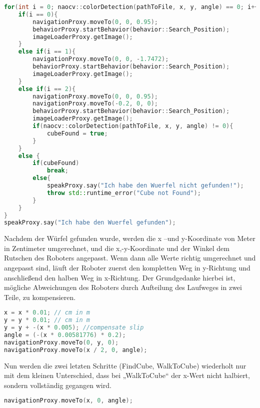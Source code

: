 \begin{lstlisting}[language=c++,
                   caption={Mainloop, Teil 2},
                   label={lst:main2}]
for(int i = 0; naocv::colorDetection(pathToFile, x, y, angle) == 0; i++){
    if(i == 0){
        navigationProxy.moveTo(0, 0, 0.95);
        behaviorProxy.startBehavior(behavior::Search_Position);
        imageLoaderProxy.getImage();
    }
    else if(i == 1){
        navigationProxy.moveTo(0, 0, -1.7472);
        behaviorProxy.startBehavior(behavior::Search_Position);
        imageLoaderProxy.getImage();
    }
    else if(i == 2){
        navigationProxy.moveTo(0, 0, 0.95);
        navigationProxy.moveTo(-0.2, 0, 0);
        behaviorProxy.startBehavior(behavior::Search_Position);
        imageLoaderProxy.getImage();
        if(naocv::colorDetection(pathToFile, x, y, angle) != 0){
            cubeFound = true;
        }
    }
    else {
        if(cubeFound)
            break;
        else{
            speakProxy.say("Ich habe den Wuerfel nicht gefunden!");
            throw std::runtime_error("Cube not Found");
        }
    }
}
speakProxy.say("Ich habe den Wuerfel gefunden");
\end{lstlisting}

        Nachdem der Würfel gefunden wurde, werden die x –und y-Koordinate von
        Meter in Zentimeter umgerechnet, und die x,-y-Koordinate und der Winkel
        dem Rutschen des Roboters angepasst.
        Wenn dann alle Werte richtig umgerechnet und angepasst sind, läuft der
        Roboter zuerst den kompletten Weg in y-Richtung und anschließend den
        halben Weg in x-Richtung.
        Der Grundgedanke hierbei ist, mögliche Abweichungen des Roboters durch
        Aufteilung des Laufweges in zwei Teile, zu kompensieren.

\begin{lstlisting}[language=c++,
                   caption={Mainloop, Teil 3},
                   label={lst:main3}]
x = x * 0.01; // cm in m
y = y * 0.01; // cm in m
y = y + -(x * 0.005); //compensate slip
angle = (-(x * 0.00581776) * 0.2);
navigationProxy.moveTo(0, y, 0);
navigationProxy.moveTo(x / 2, 0, angle);
\end{lstlisting}

        Nun werden die zwei letzten Schritte (FindCube, WalkToCube) wiederholt
        nur mit dem kleinen Unterschied, dass bei „WalkToCube“ der x-Wert nicht
        halbiert, sondern vollständig gegangen wird.

\begin{lstlisting}[language=c++,
                   caption={Mainloop, Teil 4},
                   label={lst:main4}]
navigationProxy.moveTo(x, 0, angle);
\end{lstlisting}

